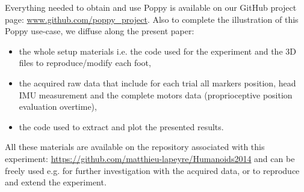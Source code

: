 Everything needed to obtain and use Poppy is available on our GitHub project page: \url{www.github.com/poppy_project}. Also to complete the illustration of this Poppy use-case, we diffuse along the present paper:
\begin{itemize}
     \item the whole setup materials i.e. the code used for the experiment and the 3D files to reproduce/modify each foot,
     \item the acquired raw data that include for each trial all markers position, head IMU measurement and the complete motors data (proprioceptive position evaluation overtime),
     \item the code used to extract and plot the presented results.
\end{itemize}

All these materials are available on the repository associated with this experiment: \url{https://github.com/matthieu-lapeyre/Humanoids2014} and can be freely used e.g. for further investigation with the acquired data, or to reproduce and extend the experiment.
